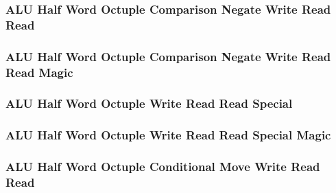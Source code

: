 \subsubsection[{\small ALU Half Word Octuple Comparison Negate Write Read Read}]{ALU Half Word Octuple Comparison Negate Write Read Read} \label{sec:format-ALU-HOCNWRR}



\subsubsection[{\small ALU Half Word Octuple Comparison Negate Write Read Read Magic}]{ALU Half Word Octuple Comparison Negate Write Read Read Magic} \label{sec:format-ALU-HOCNWRR.M}



\subsubsection[{\small ALU Half Word Octuple Write Read Read Special}]{ALU Half Word Octuple Write Read Read Special} \label{sec:format-ALU-HOWRRS}



\subsubsection[{\small ALU Half Word Octuple Write Read Read Special Magic}]{ALU Half Word Octuple Write Read Read Special Magic} \label{sec:format-ALU-HOWRRS.M}



\subsubsection[{\small ALU Half Word Octuple Conditional Move Write Read Read}]{ALU Half Word Octuple Conditional Move Write Read Read} \label{sec:format-ALU-HOCMWRR}



